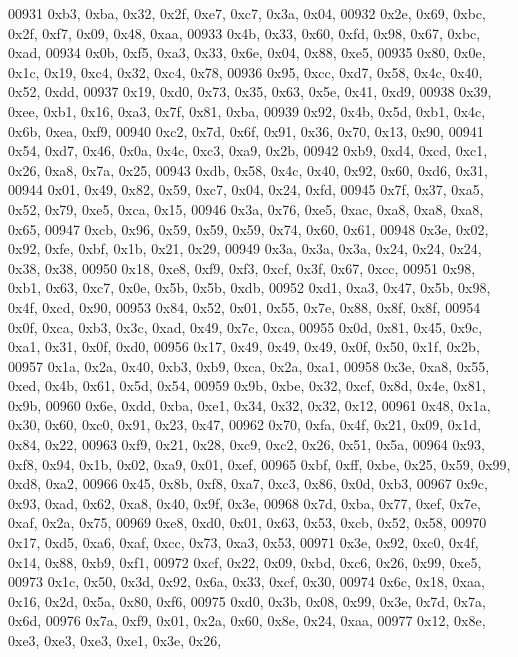 \begin{DoxyCode}
00931   0xb3, 0xba, 0x32, 0x2f, 0xe7, 0xc7, 0x3a, 0x04,
00932   0x2e, 0x69, 0xbc, 0x2f, 0xf7, 0x09, 0x48, 0xaa,
00933   0x4b, 0x33, 0x60, 0xfd, 0x98, 0x67, 0xbc, 0xad,
00934   0x0b, 0xf5, 0xa3, 0x33, 0x6e, 0x04, 0x88, 0xe5,
00935   0x80, 0x0e, 0x1c, 0x19, 0xc4, 0x32, 0xc4, 0x78,
00936   0x95, 0xcc, 0xd7, 0x58, 0x4c, 0x40, 0x52, 0xdd,
00937   0x19, 0xd0, 0x73, 0x35, 0x63, 0x5e, 0x41, 0xd9,
00938   0x39, 0xee, 0xb1, 0x16, 0xa3, 0x7f, 0x81, 0xba,
00939   0x92, 0x4b, 0x5d, 0xb1, 0x4c, 0x6b, 0xea, 0xf9,
00940   0xc2, 0x7d, 0x6f, 0x91, 0x36, 0x70, 0x13, 0x90,
00941   0x54, 0xd7, 0x46, 0x0a, 0x4c, 0xc3, 0xa9, 0x2b,
00942   0xb9, 0xd4, 0xcd, 0xc1, 0x26, 0xa8, 0x7a, 0x25,
00943   0xdb, 0x58, 0x4c, 0x40, 0x92, 0x60, 0xd6, 0x31,
00944   0x01, 0x49, 0x82, 0x59, 0xc7, 0x04, 0x24, 0xfd,
00945   0x7f, 0x37, 0xa5, 0x52, 0x79, 0xe5, 0xca, 0x15,
00946   0x3a, 0x76, 0xe5, 0xac, 0xa8, 0xa8, 0xa8, 0x65,
00947   0xcb, 0x96, 0x59, 0x59, 0x59, 0x74, 0x60, 0x61,
00948   0x3e, 0x02, 0x92, 0xfe, 0xbf, 0x1b, 0x21, 0x29,
00949   0x3a, 0x3a, 0x3a, 0x24, 0x24, 0x24, 0x38, 0x38,
00950   0x18, 0xe8, 0xf9, 0xf3, 0xcf, 0x3f, 0x67, 0xcc,
00951   0x98, 0xb1, 0x63, 0xc7, 0x0e, 0x5b, 0x5b, 0xdb,
00952   0xd1, 0xa3, 0x47, 0x5b, 0x98, 0x4f, 0xcd, 0x90,
00953   0x84, 0x52, 0x01, 0x55, 0x7e, 0x88, 0x8f, 0x8f,
00954   0x0f, 0xca, 0xb3, 0x3c, 0xad, 0x49, 0x7c, 0xca,
00955   0x0d, 0x81, 0x45, 0x9c, 0xa1, 0x31, 0x0f, 0xd0,
00956   0x17, 0x49, 0x49, 0x49, 0x0f, 0x50, 0x1f, 0x2b,
00957   0x1a, 0x2a, 0x40, 0xb3, 0xb9, 0xca, 0x2a, 0xa1,
00958   0x3e, 0xa8, 0x55, 0xed, 0x4b, 0x61, 0x5d, 0x54,
00959   0x9b, 0xbe, 0x32, 0xcf, 0x8d, 0x4e, 0x81, 0x9b,
00960   0x6e, 0xdd, 0xba, 0xe1, 0x34, 0x32, 0x32, 0x12,
00961   0x48, 0x1a, 0x30, 0x60, 0xc0, 0x91, 0x23, 0x47,
00962   0x70, 0xfa, 0x4f, 0x21, 0x09, 0x1d, 0x84, 0x22,
00963   0xf9, 0x21, 0x28, 0xc9, 0xc2, 0x26, 0x51, 0x5a,
00964   0x93, 0xf8, 0x94, 0x1b, 0x02, 0xa9, 0x01, 0xef,
00965   0xbf, 0xff, 0xbe, 0x25, 0x59, 0x99, 0xd8, 0xa2,
00966   0x45, 0x8b, 0xf8, 0xa7, 0xc3, 0x86, 0x0d, 0xb3,
00967   0x9c, 0x93, 0xad, 0x62, 0xa8, 0x40, 0x9f, 0x3e,
00968   0x7d, 0xba, 0x77, 0xef, 0x7e, 0xaf, 0x2a, 0x75,
00969   0xe8, 0xd0, 0x01, 0x63, 0x53, 0xcb, 0x52, 0x58,
00970   0x17, 0xd5, 0xa6, 0xaf, 0xcc, 0x73, 0xa3, 0x53,
00971   0x3e, 0x92, 0xc0, 0x4f, 0x14, 0x88, 0xb9, 0xf1,
00972   0xcf, 0x22, 0x09, 0xbd, 0xc6, 0x26, 0x99, 0xe5,
00973   0x1c, 0x50, 0x3d, 0x92, 0x6a, 0x33, 0xcf, 0x30,
00974   0x6c, 0x18, 0xaa, 0x16, 0x2d, 0x5a, 0x80, 0xf6,
00975   0xd0, 0x3b, 0x08, 0x99, 0x3e, 0x7d, 0x7a, 0x6d,
00976   0x7a, 0xf9, 0x01, 0x2a, 0x60, 0x8e, 0x24, 0xaa,
00977   0x12, 0x8e, 0xe3, 0xe3, 0xe3, 0xe1, 0x3e, 0x26,

\end{DoxyCode}
